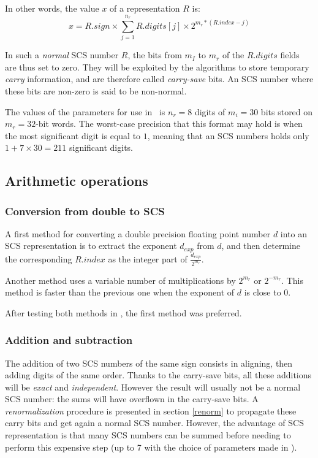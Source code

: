 In other words, the value  $x$ of a representation $R$  is:
\begin{equation}
\label{eqn4}
x = R.sign \times \sum_{j=1}^{n_r} R.digits[j] \times 2^{m_r * (R.index - j)}
\end{equation}

In such a \emph{normal} SCS number $R$, the bits from $m_I$ to $m_r$
of the $R.digits$ fields are thus set to zero. They will be exploited
by the algorithms to store temporary \emph{carry} information, and are
therefore called \emph{carry-save} bits. An SCS number where these
bits are non-zero is said to be non-normal.

The values of the parameters for use in \crlibm\ is $n_r=8$ digits of
$m_i=30$ bits stored on $m_r=32$-bit words. The worst-case precision
that this format may hold is when the most significant digit is equal
to $1$, meaning that an SCS numbers holds only $1+7\times 30=211$
significant digits.


\subsection{Arithmetic operations\label{sec:ops}}


\subsubsection{Conversion from double to SCS}
 A first method for converting a double precision floating
point number $d$ into an SCS representation is to extract the
exponent $d_{exp}$ from $d$, and then determine the corresponding
$R.index$ as the integer part of
$\frac{d_{exp}}{2^{m_r}}$.

Another method uses a variable number of multiplications by
$2^{m_r}$ or $2^{-m_r}$. This method is faster than the previous one
when the exponent of $d$ is close to $0$.

After testing both methods in \crlibm, the first method was preferred.


\subsubsection{Addition and subtraction}

The addition of two SCS numbers of the same sign consists in aligning,
then adding digits of the same order. Thanks to the carry-save bits,
all these additions will be \emph{exact} and \emph{independent}.
However the result will usually not be a normal SCS number: the sums
will have overflown in the carry-save bits. A \emph{renormalization}
procedure is presented in section \ref{renorm} to propagate these
carry bits and get again a normal SCS number.  However, the advantage
of SCS representation is that many SCS numbers can be summed before
needing to perform this expensive step (up to 7 with the choice of
parameters made in \crlibm).

